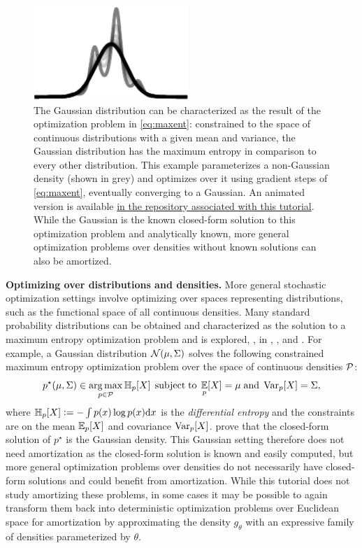 \begin{figure}[t]
\centering
\includegraphics[width=2.3in]{fig/maxent.pdf}
\caption{
  The Gaussian distribution can be characterized as the result of
  the optimization problem in \cref{eq:maxent}:
  constrained to the space of continuous distributions with
  a given mean and variance, the Gaussian distribution has
  the maximum entropy in comparison to every other distribution.
  This example parameterizes a non-Gaussian density (shown in grey)
  and optimizes over it using gradient steps of \cref{eq:maxent},
  eventually converging to a Gaussian.
  An animated version is available
  \href{https://github.com/facebookresearch/amortized-optimization-tutorial/blob/main/paper/fig/maxent.gif}{in the repository associated with this tutorial}.
  While the Gaussian is the known closed-form solution to
  this optimization problem and analytically known,
  more general optimization problems over densities
  without known solutions can also be amortized.
}
\end{figure}
\textbf{Optimizing over distributions and densities.}
More general stochastic optimization settings involve optimizing over
spaces representing distributions, such as the functional space
of all continuous densities.
Many standard probability distributions can be obtained and
characterized as the solution to a maximum entropy
optimization problem and is explored, \eg, in
\citet[Ch.~12]{cover2006elements},
\citet[p.~47]{guiasu1985principle}, and
\citet[\S6.2]{pennec2006intrinsic}.
For example, a Gaussian distribution ${\mathcal{N}}(\mu, \Sigma)$
solves the following constrained maximum entropy
optimization problem over the space of continuous densities ${\mathcal{P}}$:
\begin{equation}
  p^\star(\mu, \Sigma)\in \operatorname*{arg\,max}_{p\in{\mathcal{P}}} \operatorname{\mathbb{H}}_p[X]\; \operatorname*{subject\;to}\; \operatorname*{\mathbb{E}}_p[X] = \mu\; {\rm and}\; \operatorname{\rm{Var}}_p[X] = \Sigma,
  \label{eq:maxent}
\end{equation}
where $\operatorname{\mathbb{H}}_p[X]\vcentcolon= -\int p(x)\log p(x){\rm d}x$ is the \emph{differential entropy}
and the constraints are on the mean $\operatorname*{\mathbb{E}}_p[X]$ and covariance $\operatorname{\rm{Var}}_p[X]$.
\citet[Theorem~8.6.5 and Example~12.2.8]{cover2006elements} prove that the closed-form solution
of $p^\star$ is the Gaussian density.
This Gaussian setting therefore does not need amortization as the
closed-form solution is known and easily computed, but
more general optimization problems over densities do not necessarily
have closed-form solutions and could benefit from amortization.
While this tutorial does not study amortizing these problems, in some cases it may
be possible to again transform them back into deterministic optimization problems
over Euclidean space for amortization by approximating the density $g_\theta$
with an expressive family of densities parameterized by $\theta$.

